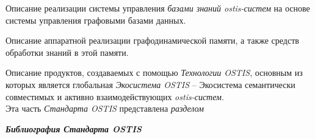 \begin{SCn}
{\begin{scnitemize}
\begin{scnitemizeii}
\begin{scnitemizeiii}
				\end{scnitemizeiii}
				\item Описание реализации системы управления \textit{базами знаний
					ostis-систем} на основе системы управления графовыми базами данных.
				\item Описание аппаратной реализации графодинамической памяти, а также
				средств обработки знаний в этой памяти.
			\end{scnitemizeii}
			\item Описание продуктов, создаваемых с помощью \textit{Технологии
				OSTIS}, основным из которых является глобальная \textit{Экосистема OSTIS} --
			Экосистема семантически совместимых и активно взаимодействующих
			\textit{ostis-систем}.\\Эта часть \textit{Стандарта OSTIS} представлена
			\textit{разделом} 
			\item \textit{\textbf{Библиография Стандарта OSTIS}}
		\end{scnitemize}
	}
\end{SCn}